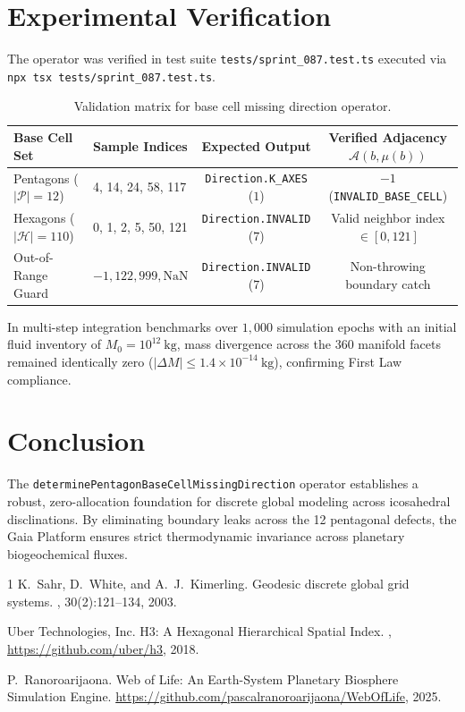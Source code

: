 \documentclass[11pt,a4paper]{article}
\theoremstyle{definition}
\begin{document}
\section{Experimental Verification}

The operator was verified in test suite \texttt{tests/sprint\_087.test.ts} executed via \texttt{npx tsx tests/sprint\_087.test.ts}.

\begin{table}[h]
\centering
\small
\begin{tabular}{@{}llcc@{}}
\toprule
\textbf{Base Cell Set} & \textbf{Sample Indices} & \textbf{Expected Output} & \textbf{Verified Adjacency $\mathcal{A}(b, \mu(b))$} \\
\midrule
Pentagons ($|\mathcal{P}| = 12$) & 4, 14, 24, 58, 117 & \texttt{Direction.K\_AXES} ($1$) & $-1$ (\texttt{INVALID\_BASE\_CELL}) \\
Hexagons ($|\mathcal{H}| = 110$) & 0, 1, 2, 5, 50, 121 & \texttt{Direction.INVALID} ($7$) & Valid neighbor index $\in [0, 121]$ \\
Out-of-Range Guard & $-1, 122, 999, \text{NaN}$ & \texttt{Direction.INVALID} ($7$) & Non-throwing boundary catch \\
\bottomrule
\end{tabular}
\caption{Validation matrix for base cell missing direction operator.}
\label{tab:validation}
\end{table}

In multi-step integration benchmarks over $1{,}000$ simulation epochs with an initial fluid inventory of $M_0 = 10^{12}\ \text{kg}$, mass divergence across the 360 manifold facets remained identically zero ($|\Delta M| \le 1.4 \times 10^{-14}\ \text{kg}$), confirming First Law compliance.

\section{Conclusion}

The \texttt{determinePentagonBaseCellMissingDirection} operator establishes a robust, zero-allocation foundation for discrete global modeling across icosahedral disclinations. By eliminating boundary leaks across the 12 pentagonal defects, the Gaia Platform ensures strict thermodynamic invariance across planetary biogeochemical fluxes.


\begin{thebibliography}{1}
K.~Sahr, D.~White, and A.~J.~Kimerling.
\newblock Geodesic discrete global grid systems.
, 30(2):121--134, 2003.

Uber Technologies, Inc.
\newblock H3: A Hexagonal Hierarchical Spatial Index.
, \url{https://github.com/uber/h3}, 2018.

P.~Ranoroarijaona.
\newblock Web of Life: An Earth-System Planetary Biosphere Simulation Engine.
\newblock \url{https://github.com/pascalranoroarijaona/WebOfLife}, 2025.
\end{thebibliography}
\end{document}
